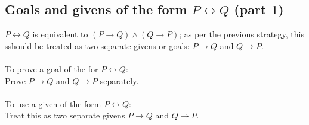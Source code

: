 \documentclass{report}
\theoremstyle{definition}
\begin{document}
\subsection{Goals and givens of the form $P\leftrightarrow Q$ (part 1)}
$P\leftrightarrow Q$ is equivalent to $(P\to Q)\land(Q\to P)$; as per the previous strategy, this sshould be treated as two separate givens or goals: $P\to Q$ and $Q\to P$.\\
\vspace{1mm}\\
\indent To prove a goal of the for $P\leftrightarrow Q$:\\
\indent Prove $P\to Q$ and $Q\to P$ separately.\\
\vspace{1mm}\\
\indent To use a given of the form $P\leftrightarrow Q$:\\
\indent Treat this as two separate givens $P\to Q$ and $Q\to P$.
\end{document}
